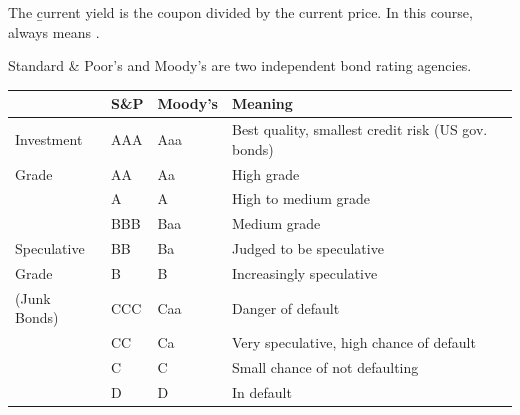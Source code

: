 \begin{center}
\end{center}

The \b{current yield} is the coupon divided by the current price. In this course,  always means .

\begin{minipage}{\textwidth}
Standard \& Poor's and Moody's are two independent bond rating agencies.
\begin{center}
\begin{tabular}{@{}llll@{}}
    \toprule
    & S\&P & Moody's & Meaning\\
    \midrule
    Investment & AAA & Aaa & Best quality, smallest credit risk (US gov. bonds)\\
    Grade & AA & Aa & High grade\\
    & A & A & High to medium grade\\
    & BBB & Baa & Medium grade\\
    \midrule
    Speculative & BB & Ba & Judged to be speculative\\
    Grade & B & B & Increasingly speculative\\
    (Junk Bonds) & CCC & Caa & Danger of default\\
    & CC & Ca & Very speculative, high chance of default\\
    & C & C & Small chance of not defaulting\\
    & D & D & In default\\
    \bottomrule
\end{tabular}
\end{center}
\end{minipage}







\newlecture[][]